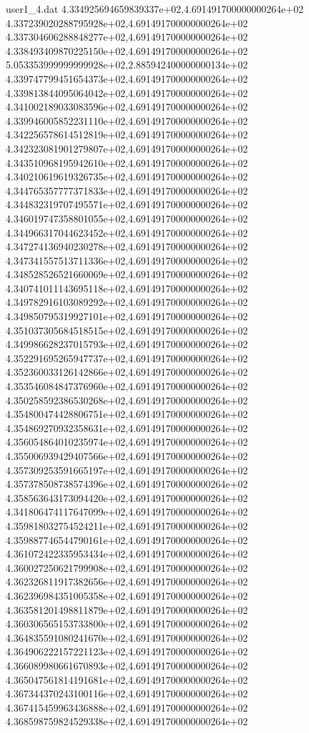 \begin{filecontents}{user1_4.dat}
4.334925694659839337e+02,4.691491700000000264e+02
4.337239020288795928e+02,4.691491700000000264e+02
4.337304606288848277e+02,4.691491700000000264e+02
4.338493409870225150e+02,4.691491700000000264e+02
5.053353999999999928e+02,2.885942400000000134e+02
4.339747799451654373e+02,4.691491700000000264e+02
4.339813844095064042e+02,4.691491700000000264e+02
4.341002189033083596e+02,4.691491700000000264e+02
4.339946005852231110e+02,4.691491700000000264e+02
4.342256578614512819e+02,4.691491700000000264e+02
4.342323081901279807e+02,4.691491700000000264e+02
4.343510968195942610e+02,4.691491700000000264e+02
4.340210619619326735e+02,4.691491700000000264e+02
4.344765357777371833e+02,4.691491700000000264e+02
4.344832319707495571e+02,4.691491700000000264e+02
4.346019747358801055e+02,4.691491700000000264e+02
4.344966317044623452e+02,4.691491700000000264e+02
4.347274136940230278e+02,4.691491700000000264e+02
4.347341557513711336e+02,4.691491700000000264e+02
4.348528526521660069e+02,4.691491700000000264e+02
4.340741011143695118e+02,4.691491700000000264e+02
4.349782916103089292e+02,4.691491700000000264e+02
4.349850795319927101e+02,4.691491700000000264e+02
4.351037305684518515e+02,4.691491700000000264e+02
4.349986628237015793e+02,4.691491700000000264e+02
4.352291695265947737e+02,4.691491700000000264e+02
4.352360033126142866e+02,4.691491700000000264e+02
4.353546084847376960e+02,4.691491700000000264e+02
4.350258592386530268e+02,4.691491700000000264e+02
4.354800474428806751e+02,4.691491700000000264e+02
4.354869270932358631e+02,4.691491700000000264e+02
4.356054864010235974e+02,4.691491700000000264e+02
4.355006939429407566e+02,4.691491700000000264e+02
4.357309253591665197e+02,4.691491700000000264e+02
4.357378508738574396e+02,4.691491700000000264e+02
4.358563643173094420e+02,4.691491700000000264e+02
4.341806474117647099e+02,4.691491700000000264e+02
4.359818032754524211e+02,4.691491700000000264e+02
4.359887746544790161e+02,4.691491700000000264e+02
4.361072422335953434e+02,4.691491700000000264e+02
4.360027250621799908e+02,4.691491700000000264e+02
4.362326811917382656e+02,4.691491700000000264e+02
4.362396984351005358e+02,4.691491700000000264e+02
4.363581201498811879e+02,4.691491700000000264e+02
4.360306565153733800e+02,4.691491700000000264e+02
4.364835591080241670e+02,4.691491700000000264e+02
4.364906222157221123e+02,4.691491700000000264e+02
4.366089980661670893e+02,4.691491700000000264e+02
4.365047561814191681e+02,4.691491700000000264e+02
4.367344370243100116e+02,4.691491700000000264e+02
4.367415459963436888e+02,4.691491700000000264e+02
4.368598759824529338e+02,4.691491700000000264e+02

\end{filecontents}
